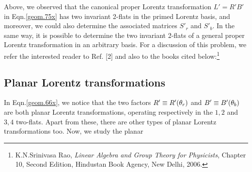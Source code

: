 Above, we observed that  the canonical proper Lorentz 
transformation $L'= R'B'$  in Eqn.\eqref{geom.75x} has 
two invariant 2-flats in the primed Lorentz basis, and 
moreover, we could also determine  the associated 
matrices $S'_r$ and $S'_b$. In the same way, it is 
possible to determine the two invariant 2-flats of a 
general proper Lorentz transformation in an arbitrary 
basis. For a discussion of this problem, we refer the 
interested reader to Ref. [2] and also to the 
books cited below:\footnote{K.N.Srinivasa Rao, 
\textsl{Linear Algebra and Group Theory for 
Physicists}, Chapter 10, Second Edition, Hindustan Book 
Agency, New Delhi, 2006.}
\subsection{Planar Lorentz transformations} 
 In 
Eqn.\eqref{geom.66x}, we notice that the two factors 
$R'\equiv R'({\theta}_r)$ and $B'\equiv B'({\theta}_b)$ are 
both planar Lorentz transformations, operating 
respectively in the $1,2$ and $3,4$ two-flats. Apart 
from these, there are other types of planar Lorentz 
transformations too. Now, we study the {planar} 
